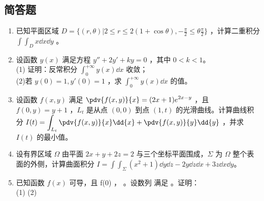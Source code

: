 \subsection{简答题}
\begin{enumerate}
\item 已知平面区域 $\displaystyle D=\{(r,\theta)|2 \le r \le 2(1+\cos \theta),-\frac{\pi}{2} \le \theta \frac{\pi}{2}\}$  ，计算二重积分 $\displaystyle \int\int_D x\dd{x}\dd{y}$ 。
\item 设函数 $y(x)$ 满足方程 $y''+2y'+ky=0$ ，其中 $0<k<1$。\\
(1) 证明：反常积分  $\displaystyle \int_0^{+\infty} y(x)\dd{x}$ 收敛；\\
(2)若 $y(0)=1,y'(0)=1$  ，求 $\displaystyle \int_0^{+\infty} y(x)\dd{x}$ 的值。
\item 设函数 $f(x,y)$ 满足 $\displaystyle \pdv{f(x,y)}{x}=(2x+1)e^{2x-y}$ ，且 $f(0,y)=y+1$  ，$L_t$ 是从点 $(0,0)$ 到点 $(1,t)$ 的光滑曲线。计算曲线积分 $\displaystyle I(t)=\int_{L_t}\pdv{f(x,y)}{x}\dd{x}+\pdv{f(x,y)}{y}\dd{y}$ ，并求 $I(t)$ 的最小值。
\item 设有界区域 $\Omega$ 由平面 $2x+y+2z=2$ 与三个坐标平面围成，$\Sigma$  为 $\Omega$ 整个表面的外侧，计算曲面积分 $\displaystyle I=\int\int_\Sigma (x^2+1)\dd{y}\dd{z}-2y\dd{z}\dd{x}+3z\dd{x}\dd{y}$。
\item 已知函数 $f(x)$ 可导，且 f(0) ，  。设数列  满足  。证明：\\
(1)
(2)
\end{enumerate}

